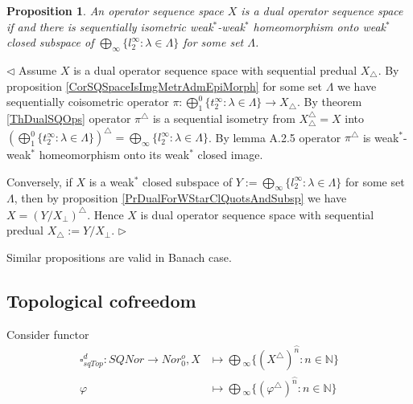 \documentclass[12pt]{article}
\newtheorem{proposition}[theorem]{Proposition}
\newenvironment{proof}{\par $\triangleleft$}{$\triangleright$}
\begin{document}
\begin{proposition}\label{PrCharacDualSQSp} An operator sequence space $X$ is a dual operator sequence space if and there is sequentially isometric weak${}^*$-weak${}^*$ homeomorphism onto weak${}^*$ closed subspace of $\bigoplus_\infty\{l_2^\infty:\lambda\in\Lambda\}$  for some set $\Lambda$.
\end{proposition}
\begin{proof}
Assume $X$ is a dual operator sequence space with sequential predual $X_\triangle$. By proposition \ref{CorSQSpaceIsImgMetrAdmEpiMorph} for some set $\Lambda$ we have sequentially coisometric operator $\pi:\bigoplus_1^0\{t_2^\infty:\lambda\in\Lambda\}\to X_\triangle$. By theorem \ref{ThDualSQOps} operator $\pi^\triangle$ is a sequential isometry from $X_\triangle^\triangle=X$ into $(\bigoplus_1^0\{t_2^\infty:\lambda\in\Lambda\})^\triangle=\bigoplus_\infty\{l_2^\infty:\lambda\in\Lambda\}$. By lemma A.2.5 \cite{BleOpAlgAndMods} operator $\pi^\triangle$ is weak${}^*$-weak${}^*$ homeomorphism onto its weak${}^*$ closed image.

Conversely, if $X$ is a weak${}^*$ closed subspace of $Y:=\bigoplus_\infty\{l_2^\infty:\lambda\in\Lambda\}$  for some set $\Lambda$, then by proposition \ref{PrDualForWStarClQuotsAndSubsp} we have $X=(Y/X_\perp)^\triangle$. Hence $X$ is dual operator sequence space with sequential predual $X_\triangle:=Y/X_\perp$.
\end{proof}

Similar propositions are valid in Banach case.






























\subsection{Topological cofreedom}

Consider functor
$$
\begin{aligned}
\square_{sqTop}^d : SQNor \to Nor_0^o, X &\mapsto \bigoplus{}_\infty \{(X^{\triangle })^{\wideparen{n}} : n \in \mathbb{N}\}\\
\varphi&\mapsto\bigoplus{}_\infty \{(\varphi^\triangle )^{\wideparen{n}} : n \in \mathbb{N}\}
\end{aligned}
$$
\end{document}
